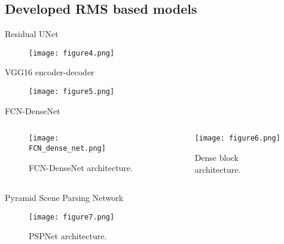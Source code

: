 \documentclass[10pt,aspectratio=169,dvipsnames]{beamer} %
\newcounter{angle}
\begin{document}
	\setcounter{subfigure}{0}
	\subsection{Developed RMS based models}	
	\begin{frame}{Residual UNet}
		\begin{figure}
			\centering
			\texttt{[image: figure4.png]}
		\end{figure}
	\end{frame}
	\begin{frame}{VGG16 encoder-decoder}
		\begin{figure}
			\centering
			\texttt{[image: figure5.png]}
		\end{figure}
	\end{frame}
	\begin{frame}{FCN-DenseNet}
		\begin{columns}[T]
			\begin{column}[c]{0.48\textwidth}
				\begin{figure}[h!]
					\texttt{[image: FCN\_dense\_net.png]}
					\caption{FCN-DenseNet architecture.} 
					\label{fcn}
				\end{figure}
			\end{column}
			\hfill
			\begin{column}[c]{0.48\textwidth}
				\begin{figure}[h!]
					\centering
					\texttt{[image: figure6.png]}
					\caption{Dense block architecture.} 
				\end{figure}
			\end{column}
		\end{columns}
	\end{frame}
	
	\begin{frame}{Pyramid Scene Parsing Network}
		\begin{figure} [h!]
			\centering
			\texttt{[image: figure7.png]}
			\caption{PSPNet architecture.} 
		\end{figure}
	\end{frame}
	
\end{document}
